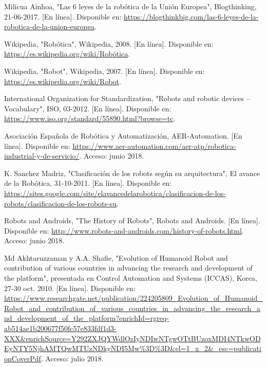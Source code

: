 \begin{thebibliography}{99} %
 Milicua Ainhoa, "Las 6 leyes de la robótica de la Unión Europea", Blogthinking, 21-06-2017. [En línea]. Disponible en: \url{https://blogthinkbig.com/las-6-leyes-de-la-robotica-de-la-union-europea}. 

 Wikipedia, "Robótica", Wikipedia, 2008. [En línea]. Disponible en: \url{https://es.wikipedia.org/wiki/Robótica}.

 Wikipedia, "Robot", Wikipedia, 2007. [En línea]. Disponible en: \url{https://es.wikipedia.org/wiki/Robot}.

 International Organization for Standardization, "Robots and robotic devices -- Vocabulary", ISO, 03-2012. [En línea]. Disponible en: \url{https://www.iso.org/standard/55890.html?browse=tc}.

 Asociación Española de Robótica y Automatización, AER-Automation. [En línea]. Disponible en: \url{https://www.aer-automation.com/aer-atp/robotica-industrial-y-de-servicio/}. Acceso: junio 2018.

 K. Sanchez Madriz, "Clasificación de los robots según su arquitectura", El avance de la Robótica, 31-10-2011. [En línea]. Disponible en: \url{https://sites.google.com/site/elavancedelarobotica/clasificacion-de-los-robots/clasificacion-de-los-robots-su}.

 Robots and Androids, "The History of Robots", Robots and Androids. [En línea]. Disponible en: \url{http://www.robots-and-androids.com/history-of-robots.html}. Acceso: junio 2018.

 Md Akhtaruzzaman y A.A. Shafie, "Evolution of Humanoid Robot and contribution of various countries in advancing the research and development of the platform", presentada en Control Automation and Systems (ICCAS), Korea, 27-30 oct. 2010. [En línea]. Disponible en: \url{https://www.researchgate.net/publication/224205809_Evolution_of_Humanoid_Robot_and_contribution_of_various_countries_in_advancing_the_research_and_development_of_the_platform?enrichId=rgreq-ab514ae1b200677f50fc57e833fdf1d3-XXX&enrichSource=Y292ZXJQYWdlOzIyNDIwNTgwOTtBUzoxMDI4NTkwODEyNTY5NjhAMTQwMTUzNDkyNDI5Mw\%3D\%3D&el=1_x_2&_esc=publicationCoverPdf}. Acceso: julio 2018.


\end{thebibliography}
